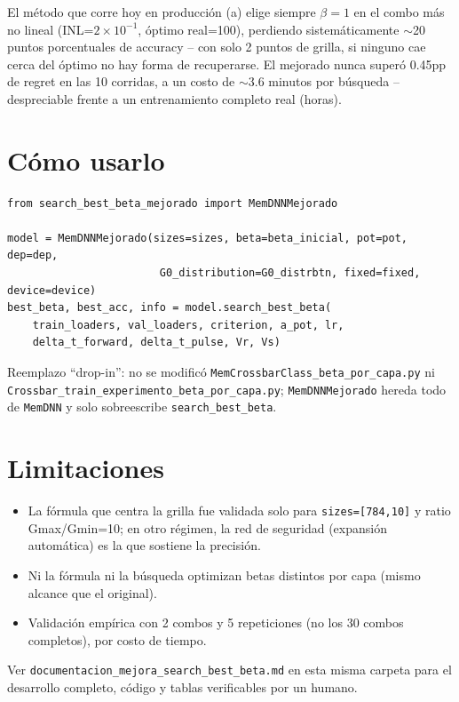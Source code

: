 \documentclass[11pt]{article}
\begin{document}
El método que corre hoy en producción (a) elige siempre $\beta=1$ en el combo más no lineal
(INL=$2\times10^{-1}$, óptimo real=100), perdiendo sistemáticamente $\sim$20 puntos
porcentuales de accuracy -- con solo 2 puntos de grilla, si ninguno cae cerca del óptimo no
hay forma de recuperarse. El mejorado nunca superó 0.45pp de regret en las 10 corridas, a un
costo de $\sim$3.6 minutos por búsqueda -- despreciable frente a un entrenamiento completo real
(horas).

\section{Cómo usarlo}

\begin{verbatim}
from search_best_beta_mejorado import MemDNNMejorado

model = MemDNNMejorado(sizes=sizes, beta=beta_inicial, pot=pot, dep=dep,
                        G0_distribution=G0_distrbtn, fixed=fixed, device=device)
best_beta, best_acc, info = model.search_best_beta(
    train_loaders, val_loaders, criterion, a_pot, lr,
    delta_t_forward, delta_t_pulse, Vr, Vs)
\end{verbatim}

Reemplazo ``drop-in'': no se modificó \texttt{MemCrossbarClass\_beta\_por\_capa.py} ni
\texttt{Crossbar\_train\_experimento\_beta\_por\_capa.py}; \texttt{MemDNNMejorado} hereda todo
de \texttt{MemDNN} y solo sobreescribe \texttt{search\_best\_beta}.

\section{Limitaciones}

\begin{itemize}
\item La fórmula que centra la grilla fue validada solo para \texttt{sizes=[784,10]} y ratio
Gmax/Gmin=10; en otro régimen, la red de seguridad (expansión automática) es la que sostiene
la precisión.
\item Ni la fórmula ni la búsqueda optimizan betas distintos por capa (mismo alcance que el
original).
\item Validación empírica con 2 combos y 5 repeticiones (no los 30 combos completos), por
costo de tiempo.
\end{itemize}

Ver \texttt{documentacion\_mejora\_search\_best\_beta.md} en esta misma carpeta para el
desarrollo completo, código y tablas verificables por un humano.
\end{document}
